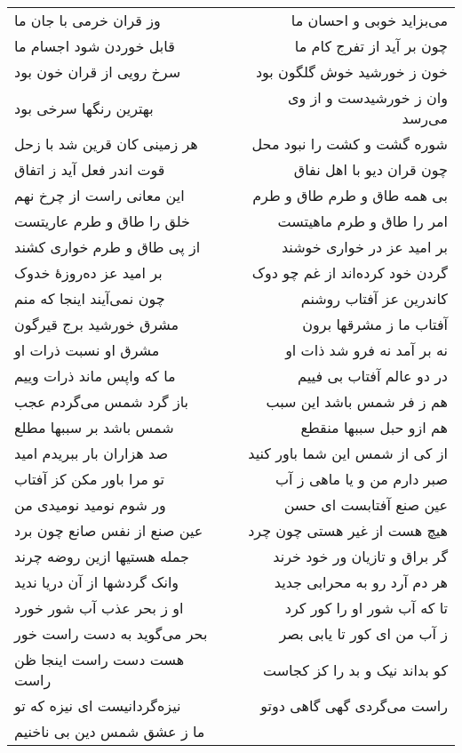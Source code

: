 \begin{center}
\begin{longtable}{l p{0.5cm} r}
\\
وز قران خرمی با جان ما
&&
می‌بزاید خوبی و احسان ما
\\
قابل خوردن شود اجسام ما
&&
چون بر آید از تفرج کام ما
\\
سرخ رویی از قران خون بود
&&
خون ز خورشید خوش گلگون بود
\\
بهترین رنگها سرخی بود
&&
وان ز خورشیدست و از وی می‌رسد
\\
هر زمینی کان قرین شد با زحل
&&
شوره گشت و کشت را نبود محل
\\
قوت اندر فعل آید ز اتفاق
&&
چون قران دیو با اهل نفاق
\\
این معانی راست از چرخ نهم
&&
بی همه طاق و طرم طاق و طرم
\\
خلق را طاق و طرم عاریتست
&&
امر را طاق و طرم ماهیتست
\\
از پی طاق و طرم خواری کشند
&&
بر امید عز در خواری خوشند
\\
بر امید عز ده‌روزهٔ خدوک
&&
گردن خود کرده‌اند از غم چو دوک
\\
چون نمی‌آیند اینجا که منم
&&
کاندرین عز آفتاب روشنم
\\
مشرق خورشید برج قیرگون
&&
آفتاب ما ز مشرقها برون
\\
مشرق او نسبت ذرات او
&&
نه بر آمد نه فرو شد ذات او
\\
ما که واپس ماند ذرات وییم
&&
در دو عالم آفتاب بی فییم
\\
باز گرد شمس می‌گردم عجب
&&
هم ز فر شمس باشد این سبب
\\
شمس باشد بر سببها مطلع
&&
هم ازو حبل سببها منقطع
\\
صد هزاران بار ببریدم امید
&&
از کی از شمس این شما باور کنید
\\
تو مرا باور مکن کز آفتاب
&&
صبر دارم من و یا ماهی ز آب
\\
ور شوم نومید نومیدی من
&&
عین صنع آفتابست ای حسن
\\
عین صنع از نفس صانع چون برد
&&
هیچ هست از غیر هستی چون چرد
\\
جمله هستیها ازین روضه چرند
&&
گر براق و تازیان ور خود خرند
\\
وانک گردشها از آن دریا ندید
&&
هر دم آرد رو به محرابی جدید
\\
او ز بحر عذب آب شور خورد
&&
تا که آب شور او را کور کرد
\\
بحر می‌گوید به دست راست خور
&&
ز آب من ای کور تا یابی بصر
\\
هست دست راست اینجا ظن راست
&&
کو بداند نیک و بد را کز کجاست
\\
نیزه‌گردانیست ای نیزه که تو
&&
راست می‌گردی گهی گاهی دوتو
\\
ما ز عشق شمس دین بی ناخنیم

\end{longtable}
\end{center}
